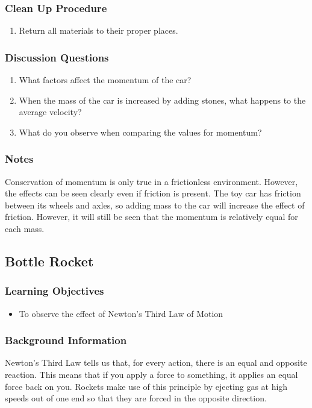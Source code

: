 \subsubsection*{Clean Up Procedure}
\begin{enumerate}
\item{Return all materials to their proper places.}
\end{enumerate}

\subsubsection*{Discussion Questions}
\begin{enumerate}
\item{What factors affect the momentum of the car?}
\item{When the mass of the car is increased by adding stones, what happens to the average velocity?}
\item{What do you observe when comparing the values for momentum?}
\end{enumerate}

\subsubsection*{Notes}
Conservation of momentum is only true in a frictionless environment.  However, the effects can be seen clearly even if friction is present.  The toy car has friction between its wheels and axles, so adding mass to the car will increase the effect of friction.  However, it will still be seen that the momentum is relatively equal for each mass.

\subsection{Bottle Rocket}

\subsubsection*{Learning Objectives}
\begin{itemize}
\item{To observe the effect of Newton's Third Law of Motion}
\end{itemize}

\subsubsection*{Background Information}
Newton's Third Law tells us that, for every action, there is an equal and opposite reaction.  This means that if you apply a force to something, it applies an equal force back on you.  Rockets make use of this principle by ejecting gas at high speeds out of one end so that they are forced in the opposite direction.

